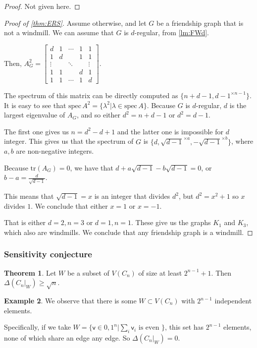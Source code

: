 \documentclass[12pt]{amsart}
\theoremstyle{definition}
\newtheorem{thm}{Theorem}[section]
\newtheorem{smpl}[thm]{Example}
\newcommand{\vv}{\mathsf{v}}
\newcommand{\tr}{\mathrm{tr}}
\newcommand{\spec}{\mathrm{spec} }
\begin{document}
\begin{proof}
Not given here.
\end{proof}

\begin{proof}[Proof of \cref{thm:ERS}]
Assume otherwise, and let $G$ be a friendship graph that is not a windmill.
We can assume that $G$ is $d$-regular, from \cref{lm:FWd}.

Then, 
$A_{G}^2 = 
\begin{bmatrix}
d & 1 & \cdots & 1 & 1\\
1 & d & & 1 & 1\\
\vdots & & \ddots &  & \vdots\\
1 & 1 & & d & 1\\
1 & 1 & \cdots & 1 & d
\end{bmatrix}$.

The spectrum of this matrix can be directly computed as $\{n + d - 1, d-1^{\times n-1}\}$.
It is easy to see that $\spec \, A^2 = \{ \lambda^2 | \lambda \in \spec \, A\}$.
Because $G$ is $d$-regular, $d$ is the largest eigenvalue of $A_G$, and so either $d^2 = n+d-1$ or $d^2 = d-1$.

The first one gives us $n = d^2 - d + 1$ and the latter one is impossible for $d$ integer.
This gives us that the spectrum of $G$ is $\{d, \sqrt{d-1}^{\times a}, -\sqrt{d-1}^{\times b}\}$, where $a, b$ are non-negative integers.

Because $\tr(A_G ) = 0$, we have that $ d + a\sqrt{d-1} - b\sqrt{d-1} = 0$, or $b-a = \frac{d}{\sqrt{d-1}}$.

This means that $\sqrt{d-1} = x$ is an integer that divides $d^2$, but $d^2 = x^2 + 1$ so $x $ divides $1$.
We conclude that either $x = 1$ or $x = -1$.

That is either $d = 2, n = 3$ or $d = 1, n=1$.
These give us the graphs $K_1$ and $K_3$, which also are windmills.
We conclude that any friendship graph is a windmill.
\end{proof}

\subsubsection*{Sensitivity conjecture}

\begin{thm}\label{thm:zhang}
Let $W$ be a subset of $V(C_n)$ of size at least $2^{n-1}+1$.
Then $\Delta(C_n|_W) \geq \sqrt{n}$.
\end{thm}

\begin{smpl}
We observe that there is some $W \subset V(C_n)$ with $2^{n-1}$ independent elements.

Specifically, if we take $W = \{ \vv \in {0, 1}^n | \sum_i \vv_i \text{ is even }\}$, this set has $2^{n-1}$ elements, none of which share an edge any edge.
So $\Delta(C_n|_W) = 0$.
\end{smpl}
\end{document}

